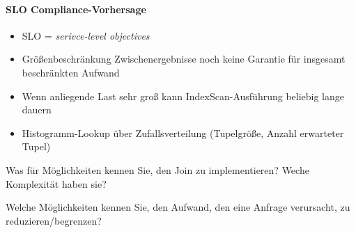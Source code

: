\paragraph{SLO Compliance-Vorhersage}
\begin{itemize}
	\item SLO = \emph{serivce-level objectives}
	\item Größenbeschränkung Zwischenergebnisse noch keine Garantie für insgesamt beschränkten Aufwand
	\item Wenn anliegende Last sehr groß kann IndexScan-Ausführung beliebig lange dauern
	\item Histogramm-Lookup über Zufallsverteilung (Tupelgröße, Anzahl erwarteter Tupel)
\end{itemize}

\begin{fragen}
	\item Was für Möglichkeiten kennen Sie, den Join zu implementieren? Weche Komplexität haben sie?
	\item Welche Möglichkeiten kennen Sie, den Aufwand, den eine Anfrage verursacht, zu reduzieren/begrenzen?
\end{fragen}